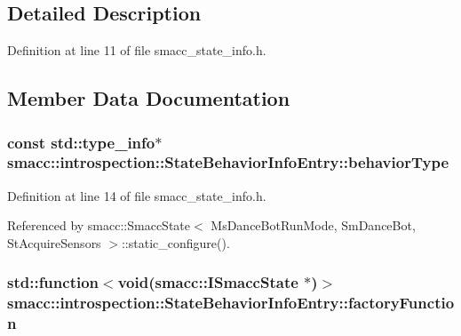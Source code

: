 \subsection{Detailed Description}


Definition at line 11 of file smacc\+\_\+state\+\_\+info.\+h.



\subsection{Member Data Documentation}
\subsubsection[{\texorpdfstring{behavior\+Type}{behaviorType}}]{\setlength{\rightskip}{0pt plus 5cm}const std\+::type\+\_\+info$\ast$ smacc\+::introspection\+::\+State\+Behavior\+Info\+Entry\+::behavior\+Type}\hypertarget{structsmacc_1_1introspection_1_1StateBehaviorInfoEntry_a7817d4924f26f4ef16dfdcf40b78b337}{}\label{structsmacc_1_1introspection_1_1StateBehaviorInfoEntry_a7817d4924f26f4ef16dfdcf40b78b337}


Definition at line 14 of file smacc\+\_\+state\+\_\+info.\+h.



Referenced by smacc\+::\+Smacc\+State$<$ Ms\+Dance\+Bot\+Run\+Mode, Sm\+Dance\+Bot, St\+Acquire\+Sensors $>$\+::static\+\_\+configure().

\subsubsection[{\texorpdfstring{factory\+Function}{factoryFunction}}]{\setlength{\rightskip}{0pt plus 5cm}std\+::function$<$void({\bf smacc\+::\+I\+Smacc\+State} $\ast$)$>$ smacc\+::introspection\+::\+State\+Behavior\+Info\+Entry\+::factory\+Function}\hypertarget{structsmacc_1_1introspection_1_1StateBehaviorInfoEntry_ac7db4e9a687700edb0207ee100aa3576}{}\label{structsmacc_1_1introspection_1_1StateBehaviorInfoEntry_ac7db4e9a687700edb0207ee100aa3576}


